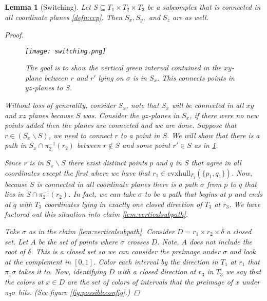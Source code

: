 \documentclass[12pt,parskip=full]{report}
\theoremstyle{plain}
\newtheorem{lem}[thm]{Lemma}
\theoremstyle{definition}
\begin{document}
\begin{lem}
    [Switching]
    \label{lem:switching} 
    Let \(S \subseteq T_1\times T_2\times T_3\) be a subcomplex that is connected in all coordinate planes \ref{defn:ccp}. Then \(S_{x}, S_{y},\) and \(S_{z}\) are as well. 
    \begin{proof}
    
    
    \begin{figure}[!h]
    \centering
    \texttt{[image: switching.png]}
    \caption{The goal is to show the vertical green interval contained in the $xy$-plane between $r$ and $r'$ lying on $\sigma$ is in $S_x$. This connects points in $yz$-planes to $S$.}
    \label{fig:switchingsketch}
\end{figure}
    
        Without loss of generality, consider \(S_{ x}\), note that \(S_{x}\) will be connected in all \(xy\) and \(xz\) planes because \(S\) was. Consider the \(yz\)-planes in \(S_{x}\), if there were no new points added then the planes are connected and we are done. Suppose that \( r \in (S_{x} \smallsetminus S )\), we need to connect \(r\) to a point in \(S\). We will show that there is a path in \(S_{x} \cap \pi_{2}^{-1} (r_{2} )\) between \(r\not\in S\) and some point \(r'\in S\) as in \ref{fig:switchingsketch}.
       
        Since \(r\) is in \(S_x \smallsetminus S\) there exist distinct points \(p\) and \(q\) in \(S\) that agree in all coordinates except the first where we have that \(r_{1} \in \text{cvxhull}_{T_{1}}  (\{p_{1} , q_{1}\})\). Now, because \(S\) is connected in all coordinate planes there is a path \(\sigma\) from \(p\) to \(q\) that lies in \(S \cap \pi_{2}^{-1} (r_{2})\). In fact, we can take \(\sigma\) to be a path that begins at \(p\) and ends at \(q\) with \(T_{3}\) coordinates lying in exactly one closed direction of \(T_{3}\) at \(r_{3}\). We have factored out this situation into claim \ref{lem:verticalsubpath}.  

        Take \(\sigma\) as in the claim \ref{lem:verticalsubpath}. Consider \(D = r_1 \times r_{2} \times \overline \delta\) a closed set. Let \(A\) be the set of points where \(\sigma\) crosses \(D\). Note, $A$ does not include the root of $\delta$. This is a closed set so we can consider the preimage under \(\sigma\) and look at the complement in \([0,1]\). Color each interval by the direction in \(T_{1}\) at \(r_{1}\) that \(\pi_{1} \sigma\) takes it to. Now, identifying \(D\) with a closed direction at \(r_3\) in \(T_3\) we say that the colors at \(x \in D\) are the set of colors of intervals that the preimage of \(x\) under \(\pi_{3} \sigma\) hits. (See figure \ref{fig:possibleconfig}.)


\end{proof}
\end{lem}
\end{document}
